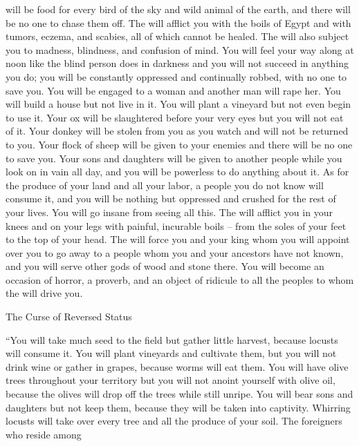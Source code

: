 {will be
food
for every
bird
of the sky
and wild animal
of the earth,
and there will be no
one to chase them off.
The
{}
will afflict
you with the boils
of Egypt
and with tumors,
eczema,
and scabies,
all of which
cannot
be healed.
The
{}
will also subject
you to madness,
blindness,
and confusion
of mind.
You will feel
your way along
at noon
like
the blind
person does in darkness
and you will not
succeed
in anything you do;
you will be
constantly
oppressed
and continually
robbed,
with no
one to save you.
You will be engaged
to a woman
and another
man
will rape
her. You will build
a house
but not
live in it. You will plant
a vineyard
but not
even begin to use it.
Your ox
will be slaughtered
before your very eyes
but you will not
eat
of it. Your donkey
will be stolen
from
you as you watch and will not
be returned
to you. Your flock
of sheep will be given
to your enemies
and there will be no
one to save you.
Your sons
and daughters
will be given
to another
people
while
you look
on in vain
all
day,
and you will be powerless
to do anything about it.
As for the produce
of your land
and all
your labor,
a people
you do not
know
will consume
it, and you will be
nothing but
oppressed
and crushed
for the rest of your lives.
You will
go insane
from seeing
all this.
The
{}
will afflict
you in your knees
and on
your legs
with painful, incurable
boils
– from the soles
of your feet
to
the top of
your head.
The
{}
will force you
and your king
whom
you will appoint
over
you to
go
away to
a people
whom
you
and your ancestors
have not
known,
and you
will serve
other
gods
of wood
and stone
there.
You will become
an occasion of horror,
a proverb,
and an object of ridicule
to all
the peoples
to whom
the {}
will drive you.
\par }{\SH The Curse of Reversed Status
\par }{\PP {}“You will take
much
seed
to the field
but gather
little
harvest, because
locusts
will consume it.
You will plant
vineyards
and cultivate
them, but you will not
drink
wine
or
gather
in grapes, because
worms
will eat them.
You will have olive
trees throughout
your territory
but you will not
anoint
yourself with olive oil,
because
the olives will drop off the trees while still unripe.
You will bear
sons
and daughters
but not
keep them, because
they will be taken into captivity.
Whirring locusts
will take over every
tree
and all
the produce
of your soil.
The foreigners
who reside among
}
